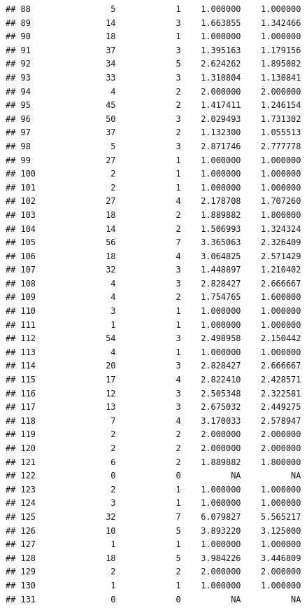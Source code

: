 \documentclass[
]{article}
\begin{document}
\begin{verbatim}
## 88                5            1    1.000000    1.000000
## 89               14            3    1.663855    1.342466
## 90               18            1    1.000000    1.000000
## 91               37            3    1.395163    1.179156
## 92               34            5    2.624262    1.895082
## 93               33            3    1.310804    1.130841
## 94                4            2    2.000000    2.000000
## 95               45            2    1.417411    1.246154
## 96               50            3    2.029493    1.731302
## 97               37            2    1.132300    1.055513
## 98                5            3    2.871746    2.777778
## 99               27            1    1.000000    1.000000
## 100               2            1    1.000000    1.000000
## 101               2            1    1.000000    1.000000
## 102              27            4    2.178708    1.707260
## 103              18            2    1.889882    1.800000
## 104              14            2    1.506993    1.324324
## 105              56            7    3.365063    2.326409
## 106              18            4    3.064825    2.571429
## 107              32            3    1.448897    1.210402
## 108               4            3    2.828427    2.666667
## 109               4            2    1.754765    1.600000
## 110               3            1    1.000000    1.000000
## 111               1            1    1.000000    1.000000
## 112              54            3    2.498958    2.150442
## 113               4            1    1.000000    1.000000
## 114              20            3    2.828427    2.666667
## 115              17            4    2.822410    2.428571
## 116              12            3    2.505348    2.322581
## 117              13            3    2.675032    2.449275
## 118               7            4    3.170033    2.578947
## 119               2            2    2.000000    2.000000
## 120               2            2    2.000000    2.000000
## 121               6            2    1.889882    1.800000
## 122               0            0          NA          NA
## 123               2            1    1.000000    1.000000
## 124               3            1    1.000000    1.000000
## 125              32            7    6.079827    5.565217
## 126              10            5    3.893220    3.125000
## 127               1            1    1.000000    1.000000
## 128              18            5    3.984226    3.446809
## 129               2            2    2.000000    2.000000
## 130               1            1    1.000000    1.000000
## 131               0            0          NA          NA

\end{verbatim}
\end{document}
